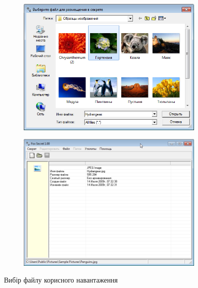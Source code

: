 \documentclass[
	a4paper,
	oneside,
	BCOR = 10mm,
	DIV = 12,
	12pt,
	headings = normal,
]{scrartcl}
\newlength{\gridunitwidth}
\begin{document}
		\begin{figure}[!htbp]
			\begin{subfigure}[b]{6 \gridunitwidth - 1em / (2-1)}
				\includegraphics[width = \columnwidth]{./assets/p08.png}
				\caption{}
				\label{subfig:payload-setup-file}
			\end{subfigure}%
			\hspace{1em}%
			\begin{subfigure}[b]{6 \gridunitwidth - 1em / (2-1)}
				\includegraphics[width = \columnwidth]{./assets/p09.png}
				\caption{}
				\label{subfig:payload-setup-info}
			\end{subfigure}
			\caption{Вибір файлу корисного навантаження}
			\label{fig:payload-setup}
		\end{figure}
\end{document}
